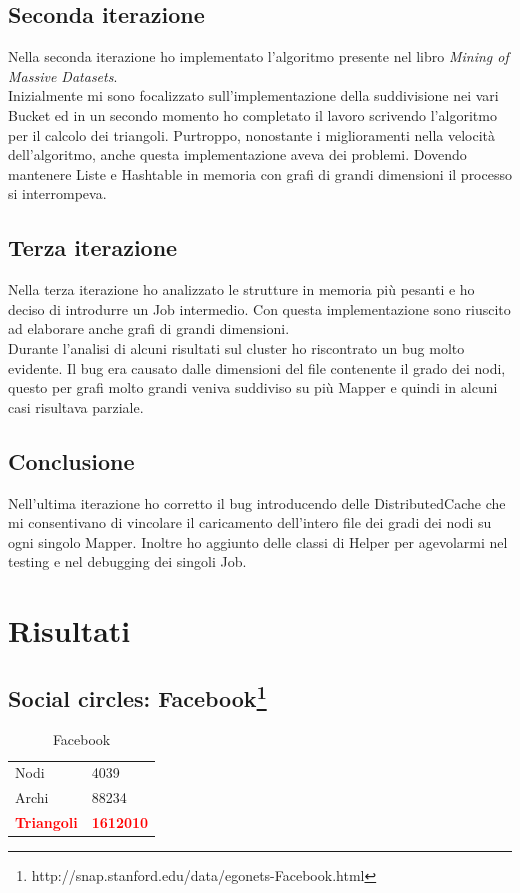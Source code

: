 \documentclass[paper=a4, fontsize=11pt]{scrartcl}	%
\numberwithin{equation}{section}															%
\numberwithin{figure}{section}																%
\numberwithin{table}{section}																%
\begin{document}
\subsection{Seconda iterazione} 
Nella seconda iterazione ho implementato l'algoritmo presente nel libro \textit{Mining of Massive Datasets}.\\
Inizialmente mi sono focalizzato sull'implementazione della suddivisione nei vari Bucket ed in un secondo momento ho completato il lavoro scrivendo l'algoritmo per il calcolo dei triangoli. Purtroppo, nonostante i miglioramenti nella velocità dell'algoritmo, anche questa implementazione aveva dei problemi. Dovendo mantenere Liste e Hashtable in memoria con grafi di grandi dimensioni il processo si interrompeva.
\subsection{Terza iterazione} 
Nella terza iterazione ho analizzato le strutture in memoria più pesanti e ho deciso di introdurre un Job intermedio. Con questa implementazione sono riuscito ad elaborare anche grafi di grandi dimensioni.\\ 
Durante l'analisi di alcuni risultati sul cluster ho riscontrato un bug molto evidente. Il bug era causato dalle dimensioni del file contenente il grado dei nodi, questo per grafi molto grandi veniva suddiviso su più Mapper e quindi in alcuni casi risultava parziale.
\subsection{Conclusione} 
Nell'ultima iterazione ho corretto il bug introducendo delle DistributedCache che mi consentivano di vincolare il caricamento dell'intero file dei gradi dei nodi su ogni singolo Mapper. Inoltre ho aggiunto delle classi di Helper per agevolarmi nel testing e nel debugging dei singoli Job.
\section{Risultati} 
\subsection{Social circles: Facebook\protect\footnote{http://snap.stanford.edu/data/egonets-Facebook.html}} 
\protect\begin{table}[!h]
	\centering
	\caption{Facebook}
	\label{my-label}
	\begin{tabular}{ll}
		Nodi		 & 4039 \\
		Archi		 & 88234 \\
		\textbf{\textcolor{red}{Triangoli}}	& \textbf{\textcolor{red}{1612010}} \\
	\end{tabular}
\end{table}
\end{document}
